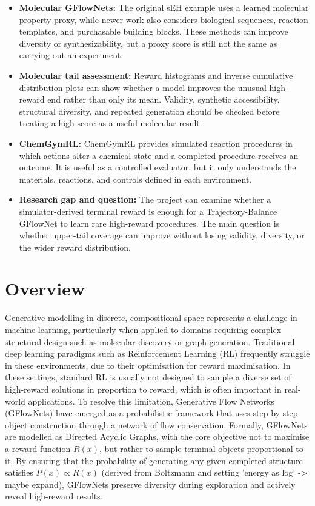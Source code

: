 \documentclass{article}
\begin{document}
\begin{itemize}
    \item \textbf{Molecular GFlowNets:} The original sEH example uses a learned molecular property proxy, while newer work also considers biological sequences, reaction templates, and purchasable building blocks. These methods can improve diversity or synthesizability, but a proxy score is still not the same as carrying out an experiment.
    \item \textbf{Molecular tail assessment:} Reward histograms and inverse cumulative distribution plots can show whether a model improves the unusual high-reward end rather than only its mean. Validity, synthetic accessibility, structural diversity, and repeated generation should be checked before treating a high score as a useful molecular result.
    \item \textbf{ChemGymRL:} ChemGymRL provides simulated reaction procedures in which actions alter a chemical state and a completed procedure receives an outcome. It is useful as a controlled evaluator, but it only understands the materials, reactions, and controls defined in each environment.
    \item \textbf{Research gap and question:} The project can examine whether a simulator-derived terminal reward is enough for a Trajectory-Balance GFlowNet to learn rare high-reward procedures. The main question is whether upper-tail coverage can improve without losing validity, diversity, or the wider reward distribution.
\end{itemize}

\section{Overview}
Generative modelling in discrete, compositional space represents a challenge in machine learning, particularly when applied to domains requiring complex structural design such as molecular discovery or graph generation. Traditional deep learning paradigms such as Reinforcement Learning (RL) frequently struggle in these environments, due to their optimisation for reward maximisation. In these settings, standard RL is usually not designed to sample a diverse set of high-reward solutions in proportion to reward, which is often important in real-world applications.
To resolve this limitation, Generative Flow Networks (GFlowNets) have emerged as a probabilistic framework that uses step-by-step object construction through a network of flow conservation. Formally, GFlowNets are modelled as Directed Acyclic Graphs, with the core objective not to maximise a reward function $R(x)$, but rather to sample terminal objects proportional to it. By ensuring that the probability of generating any given completed structure satisfies $P(x) \propto R(x)$ (derived from Boltzmann and setting 'energy as log' -> maybe expand), GFlowNets preserve diversity during exploration and actively reveal high-reward results.
\end{document}
